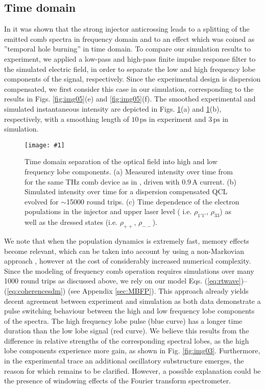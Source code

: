 \documentclass[10pt]{article}
\newcommand{\includegraphicsXL}[1]{\texttt{[image: \#1]}}
\begin{document}
	\subsection{Time domain}
	\label{sec:timedomain}	
	In \cite{burghoff2015evaluating} it was shown that the strong injector
	anticrossing leads to a splitting of the emitted comb spectra in frequency
	domain and to an effect which was coined as ''temporal hole burning'' in time
	domain. To compare our simulation results to experiment, we applied a low-pass
	and high-pass finite impulse response filter to the simulated electric field,
	in order to separate the low and high frequency lobe components of the signal,
	respectively. Since the experimental design is dispersion compensated, we
	first consider this case in our simulation, corresponding to the results in
	Figs. \ref{fig:img05}(e) and \ref{fig:img05}(f). The smoothed experimental and simulated
	instantaneous intensity are depicted in Figs. \ref{fig:img06}(a) and \ref{fig:img06}(b),
	respectively, with a smoothing length of\textrm{ }$10{\,}\mathrm{ps}$ in experiment
	and $3{\,}\mathrm{ps}$ in simulation.
	
	\begin{figure}[h!]
		\begin{center}
			\includegraphicsXL{TEMPHOLEBURNING_EXPERIMENT.eps}
		\end{center}
		\caption{Time domain separation of the optical field into high and low
			frequency lobe components. (a) Measured intensity over time from
			\cite{burghoff2015evaluating} for the same THz comb device as in
			\cite{burghoff2014terahertz}, driven with $0.9{\,}\mathrm{A}$ current.
			(b) Simulated intensity over time for a dispersion compensated QCL
			evolved for $\sim$15000 round trips. (c) Time dependence of the electron populations in the
			injector and upper laser level ( i.e. $\rho_{1'1'}$, $\rho_{33}$) as well as the dressed states (i.e. $\rho_{++}$, $\rho_{--}$).}%
		\label{fig:img06}%
	\end{figure}
	
	We note that when the population dynamics is extremely fast,
	memory effects become relevant, which can be taken into account by using a 
	non-Markovian approach \cite{butscher2005ultrafast, knezevic2013time}, however at the cost of
	considerably increased numerical complexity. Since the modeling of frequency comb
	operation requires simulations over many 1000 round trips as discussed above,
	we rely on our model Eqs. (\ref{eq:rtwave})--(\ref{eq:coherencesdm}) (see Appendix \ref{sec:MBFP}).
	This approach already yields decent agreement between experiment and simulation as both data
	demonstrate a pulse switching behaviour between the high and low frequency
	lobe components of the spectra. The high frequency lobe pulse (blue curve) has
	a longer time duration than the low lobe signal (red curve). We believe this
	results from the difference in relative strengths of the corresponding
	spectral lobes, as the high lobe components experience more gain, as shown in Fig.
	\ref{fig:img03}. Furthermore, in the experimental trace an additional
	oscillatory substructure emerges, the reason for which remains to be clarified. However, a possible explanation could be 
	the presence of windowing effects of the Fourier transform spectrometer. 
\end{document}
